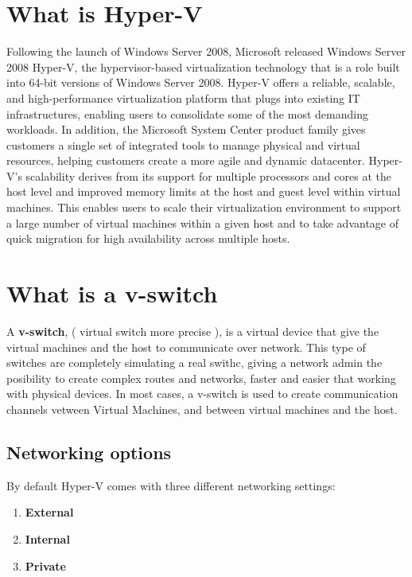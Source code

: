 \vspace{5mm}
\section{What is Hyper-V}
\vspace{5mm}

Following the launch of Windows Server 2008, Microsoft released Windows Server 2008 Hyper-V, the hypervisor-based virtualization technology that is a role 
built into 64-bit versions of Windows Server 2008. Hyper-V offers a reliable, scalable, and high-performance virtualization platform that plugs into existing IT 
infrastructures, enabling users to consolidate some of the most demanding workloads. In addition, the Microsoft System Center product family gives customers a single 
set of integrated tools to manage physical and virtual resources, helping customers create a more agile and dynamic datacenter. Hyper-V’s scalability derives from its 
support for multiple processors and cores at the host level and improved memory limits at the host and guest level within virtual machines. This enables users to scale 
their virtualization environment to support a large number of virtual machines within a given host and to take advantage of quick migration for high availability across 
multiple hosts.

\vspace{5mm}
\section{What is a v-switch}

\vspace{5mm}

A \textbf{v-switch}, ( virtual switch more precise ), is a virtual device that give the virtual machines and the host to communicate over network.
This type of switches are completely simulating a real swithc, giving a network admin the posibility to create complex routes and networks, faster and easier that working
with physical devices. In most cases, a v-switch is used to create communication channels vetween Virtual Machines, and between virtual machines and the host.

\subsection{Networking options}

By default Hyper-V comes with three different networking settings: 
\begin{enumerate}
\item \textbf{External}
\item \textbf{Internal}
\item \textbf{Private} 
\end{enumerate}

